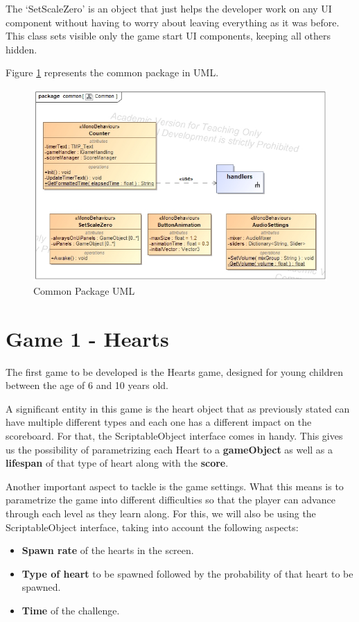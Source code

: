 The `SetScaleZero' is an object that just helps the developer work on any UI component without having to worry about leaving everything as it was before. This class sets visible only the game start UI components, keeping all others hidden.

Figure \ref{fig:common-classes} represents the common package in UML.
\begin{figure}[H]
    \centering
    \includegraphics[width=0.6\linewidth]{Chapters/new_architechture/class__common__Common.jpg}
    \caption{Common Package UML}
    \label{fig:common-classes}
\end{figure}

\newpage
\section{Game 1 - Hearts}

The first game to be developed is the Hearts game, designed for young children between the age of 6 and 10 years old.

A significant entity in this game is the heart object that as previously stated can have multiple different types and each one has a different impact on the scoreboard. For that, the ScriptableObject interface \cite{unityDocScriptableObj} comes in handy. This gives us the possibility of parametrizing each Heart to a \textbf{gameObject} as well as a \textbf{lifespan} of that type of heart along with the \textbf{score}.

Another important aspect to tackle is the game settings. What this means is to parametrize the game into different difficulties so that the player can advance through each level as they learn along.
For this, we will also be using the ScriptableObject interface, taking into account the following aspects:

\begin{itemize}[noitemsep, topsep=5pt, parsep=5pt, partopsep=5pt]
    \item \textbf{Spawn rate} of the hearts in the screen.
    \item \textbf{Type of heart} to be spawned followed by the probability of that heart to be spawned.
    \item \textbf{Time} of the challenge.
\end{itemize}

